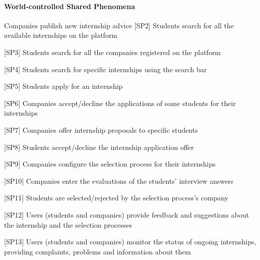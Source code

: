 				\paragraph{World-controlled Shared Phenomena}
					\begin{flushleft}
											[SP1] Companies publish new internship advice
											[SP2] Students search for all the available internships on the platform
											
											[SP3] Students search for all the companies registered on the platform
											
											[SP4] Students search for specific internships using the search bar
											
											[SP5] Students apply for an internship
											
											[SP6] Companies accept/decline the applications of some students for their internships
											
											[SP7] Companies offer internship proposals to specific students
											
											[SP8] Students accept/decline the internship application offer
											
											[SP9] Companies configure the selection process for their internships
											
											[SP10] Companies enter the evaluations of the students' interview answers
											
											[SP11] Students are selected/rejected by the selection process's company 
											
											[SP12] Users (students and companies) provide feedback and suggestions about the internship and the selection processes
											
											[SP13] Users (students and companies) monitor the status of ongoing internships, providing complaints, problems and information about them
					\end{flushleft}
				
				

					
					
